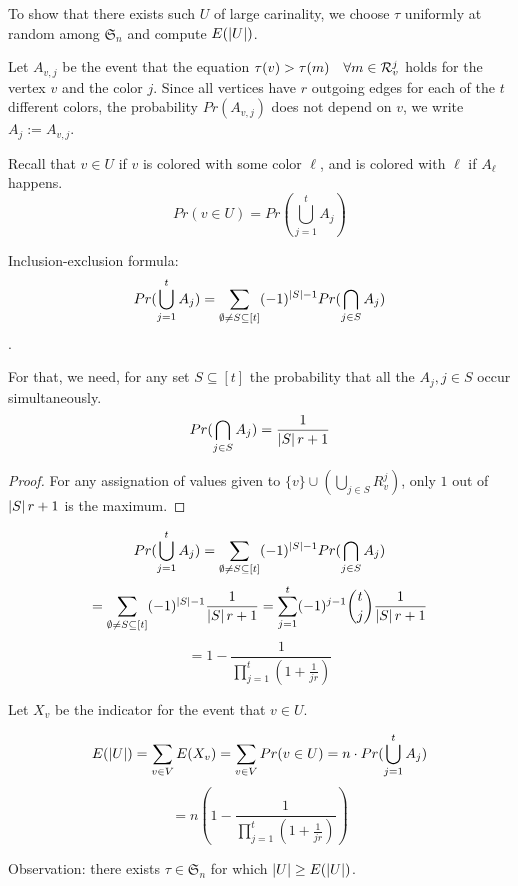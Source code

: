 \begin{frame}
    To show that there exists such $U$ of large carinality, we choose $\tau$ uniformly at random among $\mathfrak{S}_n$ and compute $E(\left\vert {U} \right\vert)$.
    
    Let $A_{v,j}$ be the event that the equation $\tau(v) > \tau(m) \quad \forall m \in \mathcal{R}_v^j$ holds for the vertex $v$ and the color $j$.
    Since all vertices have $r$ outgoing edges for each of the $t$ different colors, the probability $Pr(A_{v,j})$ does not depend on $v$, we write $A_{j} :=  A_{v,j}$.
    
    Recall that $v \in U$ if $v$ is colored with some color $\ell$, and is colored with $\ell$ if $A_{\ell}$ happens.
    $$Pr(v \in U) = Pr(\bigcup_{j=1}^{t} A_j)$$
\end{frame}

\begin{frame}
    Inclusion-exclusion formula: 
    $$Pr(\bigcup_{j=1}^{t} A_j) = \sum_{\emptyset \neq S \subseteq [t]} (-1)^{\left\vert {S} \right\vert - 1} Pr( \bigcap_{j\in S} A_j )$$.
    
    For that, we need, for any set $S \subseteq [t]$ the probability that all the $A_j, j \in S$ occur simultaneously.
    $$
        Pr(\bigcap_{j\in S} A_j ) = \frac{1}{\left\vert {S} \right\vert r+1}
    $$
    
    \begin{proof}
        For any assignation of values given to $\{v\} \cup ( \bigcup_{j\in S} R_v^j)$, only $1$ out of $\left\vert {S} \right\vert r + 1$ is the maximum.
    \end{proof}
\end{frame}

\begin{frame}
    $$
        Pr(\bigcup_{j=1}^{t} A_j)
        = \sum_{\emptyset \neq S \subseteq [t]} (-1)^{\left\vert {S} \right\vert - 1} Pr( \bigcap_{j\in S} A_j )
    $$
    $$
        = \sum_{\emptyset \neq S \subseteq [t]} (-1)^{\left\vert {S} \right\vert - 1} \frac{1}{\left\vert {S} \right\vert r+1}
        = \sum_{j=1}^{t} (-1)^{j - 1} \binom{t}{j} \frac{1}{\left\vert {S} \right\vert r+1}
    $$
    $$
        = 1 - \frac{1}{ \prod_{j=1}^{t} \left(1 + \frac{1}{jr} \right) }
    $$
\end{frame}

\begin{frame}
    Let $X_v$ be the indicator for the event that $v \in U$.
    
    $$
        E(\left\vert {U} \right\vert)
        = \sum_{v \in V} E(X_v)
        = \sum_{v \in V} Pr(v \in U)
        = n \cdot Pr(\bigcup_{j=1}^{t} A_j)
    $$
    $$
        = n (1 - \frac{1}{ \prod_{j=1}^{t} \left(1 + \frac{1}{jr} \right) })
    $$
    
    Observation: there exists $\tau \in \mathfrak{S}_n$ for which $\left\vert {U} \right\vert \geq E(\left\vert {U} \right\vert)$.
\end{frame}

